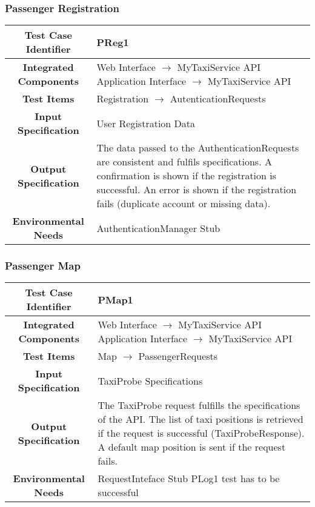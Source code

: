 \documentclass[11pt, a4paper,titlepage]{article}
\begin{document}
	\subsubsection{Passenger Registration}
	\begin{tabularx}{\textwidth}{| c|X|}
		\hline \textbf{Test Case Identifier} & \label{PReg1}PReg1 \\
		\hline \textbf{Integrated Components} &  Web Interface $\rightarrow $ MyTaxiService API \newline 
		Application Interface $\rightarrow $ MyTaxiService API \\
		\hline \textbf{Test Items} & Registration $\rightarrow $ AutenticationRequests \\
		\hline \textbf{Input Specification} & User Registration Data \\
		\hline \textbf{Output Specification} & 
		The data passed to the AuthenticationRequests are consistent and fulfils specifications.\newline
		A confirmation is shown if the registration is successful.\newline
		An error is shown if the registration fails (duplicate account or missing data). \\
		\hline \textbf{Environmental Needs} & AuthenticationManager Stub \\
		\hline
	\end{tabularx}
	\newline
	\newline
	\subsubsection{Passenger Map}
	\begin{tabularx}{\textwidth}{| c|X|}
		\hline \textbf{Test Case Identifier} & \label{PMap1}PMap1 \\
		\hline \textbf{Integrated Components} &  Web Interface $\rightarrow $ MyTaxiService API \newline 
		Application Interface $\rightarrow $ MyTaxiService API \\
		\hline \textbf{Test Items} & Map $\rightarrow $ PassengerRequests \\
		\hline \textbf{Input Specification} & TaxiProbe Specifications \\
		\hline \textbf{Output Specification} & 
		The TaxiProbe request fulfills the specifications of the API.\newline	
		The list of taxi positions is retrieved if the request is successful (TaxiProbeResponse).\newline
		A default map position is sent if the request fails.  \\
		\hline \textbf{Environmental Needs} & RequestInteface Stub \newline PLog1 test has to be successful \\
		\hline
	\end{tabularx}
	\newline
	\newline
\end{document}
